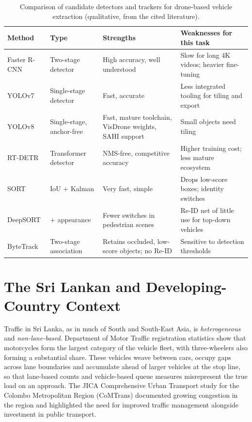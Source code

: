 \begin{table}[H]
\centering
\caption{Comparison of candidate detectors and trackers for drone-based vehicle extraction (qualitative, from the
cited literature).}
\label{tab:lit-detectors}
\small
\begin{tabularx}{\textwidth}{l l >{\raggedright\arraybackslash}X >{\raggedright\arraybackslash}X}
\toprule
Method & Type & Strengths & Weaknesses for this task \\
\midrule
Faster R-CNN \cite{ren2015faster} & Two-stage detector & High accuracy, well understood & Slow for long 4K videos; heavier fine-tuning \\
YOLOv7 \cite{wang2023yolov7} & Single-stage detector & Fast, accurate & Less integrated tooling for tiling and export \\
YOLOv8 \cite{jocher2023yolov8} & Single-stage, anchor-free & Fast, mature toolchain, VisDrone weights, SAHI support & Small objects need tiling \\
RT-DETR \cite{zhao2024rtdetr} & Transformer detector & NMS-free, competitive accuracy & Higher training cost; less mature ecosystem \\
\midrule
SORT \cite{bewley2016sort} & IoU + Kalman & Very fast, simple & Drops low-score boxes; identity switches \\
DeepSORT \cite{wojke2017deepsort} & + appearance & Fewer switches in pedestrian scenes & Re-ID net of little use for top-down vehicles \\
ByteTrack \cite{zhang2022bytetrack} & Two-stage association & Retains occluded, low-score objects; no Re-ID & Sensitive to detection thresholds \\
\bottomrule
\end{tabularx}
\end{table}

\section{The Sri Lankan and Developing-Country Context}\label{sec:lit-srilanka}
Traffic in Sri Lanka, as in much of South and South-East Asia, is \emph{heterogeneous} and \emph{non-lane-based}.
Department of Motor Traffic registration statistics \cite{dmt_stats} show that motorcycles form the largest
category of the vehicle fleet, with three-wheelers also forming a substantial share. These vehicles weave
between cars, occupy gaps across lane boundaries and accumulate ahead of larger vehicles at the stop line, so
that lane-based counts and vehicle-based queue measures misrepresent the true load on an approach. The JICA
Comprehensive Urban Transport study for the Colombo Metropolitan Region (CoMTrans) \cite{jica2014comtrans}
documented growing congestion in the region and highlighted the need for improved traffic management alongside
investment in public transport.

